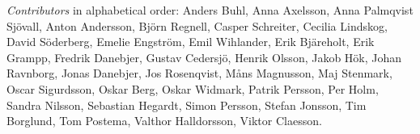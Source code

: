 \emph{Contributors} in alphabetical order:
Anders Buhl,
Anna Axelsson,
Anna Palmqvist Sjövall,
Anton Andersson,
Björn Regnell,
Casper Schreiter,
Cecilia Lindskog,
David Söderberg,
Emelie Engström,
Emil Wihlander,
Erik Bjäreholt,
Erik Grampp,
Fredrik Danebjer,
Gustav Cedersjö,
Henrik Olsson,
Jakob Hök,
Johan Ravnborg,
Jonas Danebjer,
Jos Rosenqvist,
Måns Magnusson,
Maj Stenmark,
Oscar Sigurdsson,
Oskar Berg,
Oskar Widmark,
Patrik Persson,
Per Holm,
Sandra Nilsson,
Sebastian Hegardt,
Simon Persson,
Stefan Jonsson,
Tim Borglund,
Tom Postema,
Valthor Halldorsson,
Viktor Claesson.
